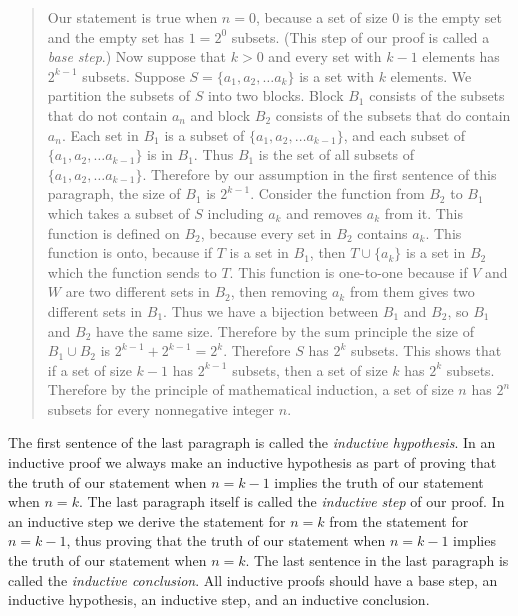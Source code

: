 \documentclass[10pt,]{book}
\theoremstyle{plain}
\theoremstyle{definition}
\numberwithin{equation}{chapter}
\begin{document}
\begin{quote}Our statement is true when \(n=0\), because a set of size 0 is the empty set and the empty set has \(1=2^0\) subsets. (This step of our proof is called a \emph{base step}.) Now suppose that \(k>0\) and every set with \(k-1\) elements has \(2^{k-1}\) subsets.  Suppose \(S=\{a_1,a_2,\ldots a_k\}\) is a set with \(k\) elements. We partition the subsets of \(S\) into two blocks.  Block \(B_1\) consists of the subsets that do not contain \(a_n\) and block \(B_2\) consists of the subsets that do contain \(a_n\).  Each set in \(B_1\) is a subset of \(\{a_1,a_2,\ldots a_{k-1}\}\), and each subset of \(\{a_1,a_2, \ldots
a_{k-1}\}\) is in \(B_1\).  Thus \(B_1\) is the set of all subsets of \(\{a_1,a_2,\ldots a_{k-1}\}\).  Therefore by our assumption in the first sentence of this paragraph, the size of \(B_1\) is \(2^{k-1}\).  Consider the function from \(B_2\) to \(B_1\) which takes a subset of \(S\) including \(a_k\) and removes \(a_k\) from it.  This function is defined on \(B_2\), because every set in \(B_2\) contains \(a_k\).  This function is onto, because if \(T\) is a set in \(B_1\), then \(T\cup \{a_k\}\) is a set in \(B_2\) which the function sends to \(T\).  This function is one-to-one because if \(V\) and \(W\) are two different sets in \(B_2\), then removing \(a_k\) from them gives two different sets in \(B_1\).  Thus we have a bijection between \(B_1\) and \(B_2\), so \(B_1\) and \(B_2\) have the same size.  Therefore by the sum principle the size of \(B_1\cup B_2\) is \(2^{k-1} +2^{k-1}=2^k\).  Therefore \(S\) has \(2^k\) subsets.  This shows that if a set of size \(k-1\) has \(2^{k-1}\) subsets, then a set of size \(k\) has \(2^k\) subsets.  Therefore by the principle of mathematical induction, a set of size \(n\) has \(2^n\) subsets for every nonnegative integer \(n\).\end{quote}
The first sentence of the last paragraph is called the \emph{inductive hypothesis}. In an inductive proof we always make an inductive hypothesis as part of proving that the truth of our statement when \(n=k-1\) implies the truth of our statement when \(n=k\). The last paragraph itself is called the \emph{inductive step} of our proof. In an inductive step we derive the statement for \(n=k\) from the statement for \(n=k-1\), thus proving that the truth of our statement when \(n=k-1\) implies the truth of our statement when \(n=k\). The last sentence in the last paragraph is called the \emph{inductive conclusion}. All inductive proofs should have a base step, an inductive hypothesis, an inductive step, and an inductive conclusion.%
\end{document}
